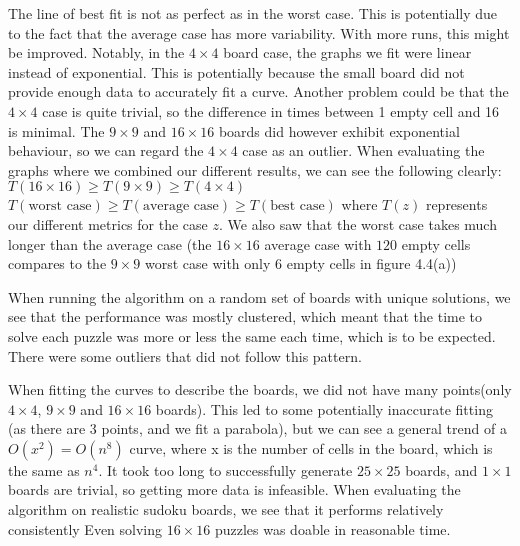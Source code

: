 \documentclass[16pt]{article}
\begin{document}
The line of best fit is not as perfect as in the worst case. 
This is potentially due to the fact that the average case has more variability.
With more runs, this might be improved.
\newline
\newline
Notably, in the $4 \times 4$ board case, the graphs we fit were linear instead of exponential. This is potentially because the small board did not provide enough data to accurately fit a curve.
Another problem could be that the $4 \times 4$ case is quite trivial, so the difference in times between 1 empty cell and 16 is minimal.
The $9 \times 9$ and $16 \times 16$ boards did however exhibit exponential behaviour, so we can regard the $4 \times 4$ case as an outlier.
\newline
\newline
When evaluating the graphs where we combined our different results, we can see the following clearly:
\newline
$T(16 \times 16) \ge T(9 \times 9) \ge T(4 \times 4)$ 
\newline
$T(\text{worst case}) \ge T(\text{average case}) \ge T(\text{best case})$ 
\newline
where $T(z)$ represents our different metrics for the case $z$.
We also saw that the worst case takes much longer than the average case (the $16 \times 16$ average case with $120$ empty cells compares to the $9 \times 9$ worst case with only $6$ empty cells  in figure 4.4(a))
\newline
\newline

When running the algorithm on a random set of boards with unique solutions, we see that the performance was mostly clustered, which meant that the time to solve each puzzle was more or less the same each time, which is to be expected.
There were some outliers that did not follow this pattern.

When fitting the curves to describe the boards, we did not have many points(only $4 \times 4$, $9 \times 9$ and $16 \times 16$ boards).
This led to some potentially inaccurate fitting (as there are 3 points, and we fit a parabola), but we can see a general trend of a $O(x^2) = O(n^8)$ curve, where x is the number of cells in the board, which is the same as $n^4$.
\newline
It took too long to successfully generate $25 \times 25$ boards, and $1 \times 1$ boards are trivial, so getting more data is infeasible.
\newline
\newline
When evaluating the algorithm on realistic sudoku boards, we see that it performs relatively consistently Even solving $16 \times 16$ puzzles was doable in reasonable time.
\end{document}
